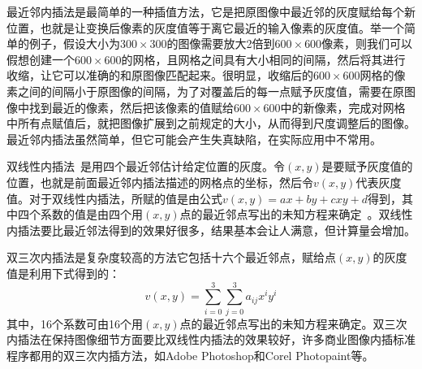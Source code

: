 最近邻内插法是最简单的一种插值方法，它是把原图像中最近邻的灰度赋给每个新位置，也就是让变换后像素的灰度值等于离它最近的输入像素的灰度值。举一个简单的例子，假设大小为$300\times 300$的图像需要放大2倍到$600\times 600$像素，则我们可以假想创建一个$600\times 600$的网格，且网格之间具有大小相同的间隔，然后将其进行收缩，让它可以准确的和原图像匹配起来。很明显，收缩后的$600\times 600$网格的像素之间的间隔小于原图像的间隔，为了对覆盖后的每一点赋予灰度值，需要在原图像中找到最近的像素，然后把该像素的值赋给$600\times 600$中的新像素，完成对网格中所有点赋值后，就把图像扩展到之前规定的大小，从而得到尺度调整后的图像。最近邻内插法虽然简单，但它可能会产生失真缺陷，在实际应用中不常用。

双线性内插法~\cite{WangShen2008double}是用四个最近邻估计给定位置的灰度。令$(x,y)$是要赋予灰度值的位置，也就是前面最近邻内插法描述的网格点的坐标，然后令$v(x,y)$代表灰度值。对于双线性内插法，所赋的值是由公式$v(x,y)=ax+by+cxy+d$得到，其中四个系数的值是由四个用$(x,y)$点的最近邻点写出的未知方程来确定~\cite{Gonzalez2005book}。双线性内插法要比最近邻法得到的效果好很多，结果基本会让人满意，但计算量会增加。

双三次内插法是复杂度较高的方法它包括十六个最近邻点，赋给点$(x,y)$的灰度值是利用下式得到的：
\begin{equation}
v(x,y)=\sum_{i=0}^{3}\sum_{j=0}^{3}a_{ij}x^{i}y^{i}
\label{式2_13}
\end{equation}
其中，16个系数可由16个用$(x,y)$点的最近邻点写出的未知方程来确定。双三次内插法在保持图像细节方面要比双线性内插法的效果较好，许多商业图像内插标准程序都用的双三次内插方法，如Adobe Photoshop和Corel Photopaint等。



